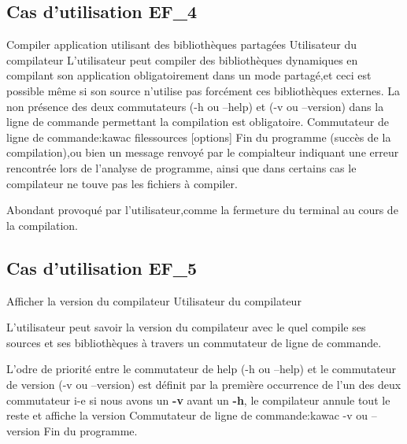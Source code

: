 \subsection{Cas d'utilisation EF\_4}
\fiche
{Compiler application utilisant des bibliothèques partagées}                      %
{Utilisateur du compilateur}                               %
{                                                %
    L'utilisateur peut compiler des bibliothèques dynamiques en compilant son application obligatoirement dans un mode partagé,et ceci est possible même si son source n'utilise pas forcément ces bibliothèques externes.      
}
{
  La non présence des deux commutateurs (-h ou --help) et (-v ou --version) dans la ligne de commande permettant la compilation est obligatoire.
}                                                %
{Commutateur de ligne de commande:kawac filessources [options] } %
{Fin du programme (succès de la compilation),ou bien un message renvoyé par le compialteur indiquant une erreur rencontrée lors de l'analyse de programme, ainsi que dans certains cas le compilateur ne touve pas les fichiers à compiler.} %
{                                                %
 
}{} %
{Abondant provoqué par l'utilisateur,comme la fermeture du terminal au cours de la compilation.} %
\subsection{Cas d'utilisation EF\_5}
\fiche
{Afficher la version du compilateur}                      %
{Utilisateur du compilateur}                               %
{                                                %
   
L'utilisateur peut savoir la version du compilateur avec le quel compile ses sources et ses bibliothèques  à travers un commutateur de ligne de commande.   
}
{
   L'odre de priorité entre le commutateur de help (-h ou --help) et le commutateur de version (-v ou --version) est définit par la première occurrence de l'un des deux commutateur i-e si nous avons un \textbf {-v} avant un \textbf {-h}, le compilateur annule tout le reste et affiche la version
}                                                %
{Commutateur de ligne de commande:kawac -v ou --version}                             %
{Fin du programme.}                       %
{                                                %
 
}{} %
{} %
